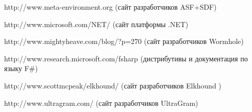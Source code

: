 \begin{thebibliography}{50}
          http://www.meta-environment.org (сайт разработчиков ASF+SDF)

             http://www.microsoft.com/NET/ (сайт платформы .NET)  

          http://www.mightyheave.com/blog/?p=270 (сайт разработчиков Wormhole)

               http://www.research.microsoft.com/fsharp (дистрибутивы и документация по языку F\#)             

         http://www.scottmcpeak/elkhound/ (сайт разработчиков Elkhound )

         http://www.ultragram.com/ (сайт разработчиков UltraGram)

\end{thebibliography}
